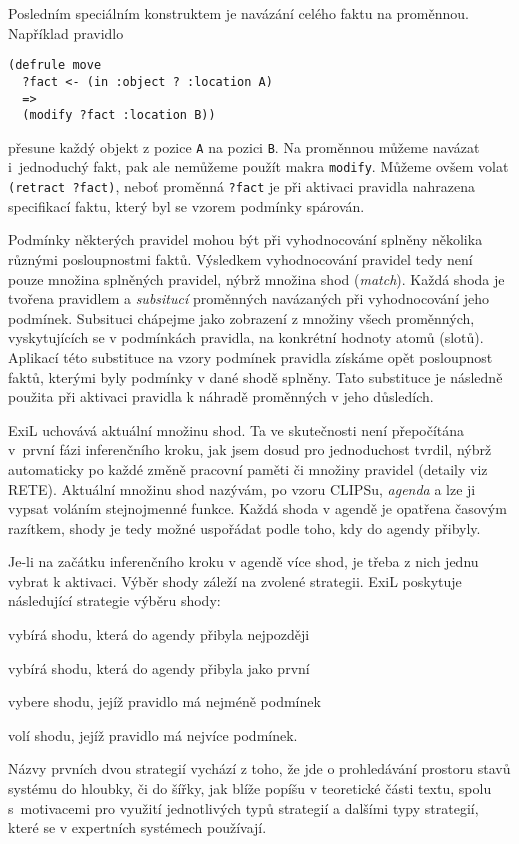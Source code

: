 Posledním speciálním konstruktem je navázání celého faktu na proměnnou.
Například pravidlo
\begin{verbatim}
(defrule move
  ?fact <- (in :object ? :location A)
  =>
  (modify ?fact :location B))
\end{verbatim}
přesune každý objekt z pozice \verb|A| na pozici \verb|B|. Na proměnnou
můžeme navázat i~jednoduchý fakt, pak ale nemůžeme použít makra \verb|modify|.
Můžeme ovšem volat \verb|(retract ?fact)|, neboť proměnná \verb|?fact| je při
aktivaci pravidla nahrazena specifikací faktu, který byl se vzorem podmínky
spárován.

Podmínky některých pravidel mohou být při vyhodnocování splněny několika různými
posloupnostmi faktů. Výsledkem vyhodnocování pravidel tedy není pouze množina
splněných pravidel, nýbrž množina shod (\emph{match}). Každá shoda je tvořena
pravidlem a \emph{subsitucí} proměnných navázaných při vyhodnocování jeho
podmínek.  Subsituci chápejme jako zobrazení z množiny všech proměnných,
vyskytujících se v podmínkách pravidla, na konkrétní hodnoty atomů (slotů).
Aplikací této substituce na vzory podmínek pravidla získáme opět posloupnost
faktů, kterými byly podmínky v dané shodě splněny. Tato substituce je následně
použita při aktivaci pravidla k náhradě proměnných v jeho důsledích.

ExiL uchovává aktuální množinu shod. Ta ve skutečnosti není přepočítána v~první
fázi inferenčního kroku, jak jsem dosud pro jednoduchost tvrdil, nýbrž
automaticky po každé změně pracovní paměti či množiny pravidel (detaily viz
RETE).  Aktuální množinu shod nazývám, po vzoru CLIPSu, \emph{agenda} a lze ji
vypsat voláním stejnojmenné funkce. Každá shoda v agendě je opatřena časovým
razítkem, shody je tedy možné uspořádat podle toho, kdy do agendy přibyly.

Je-li na začátku inferenčního kroku v agendě více shod, je třeba z nich jednu
vybrat k aktivaci. Výběr shody záleží na zvolené strategii. ExiL poskytuje
následující strategie výběru shody:
\begin{description}[leftmargin=5cm,style=sameline,align=right,labelsep=0.5cm]
  \item[depth-strategy] vybírá shodu, která do agendy přibyla nejpozději
  \item[breadth-strategy] vybírá shodu, která do agendy přibyla jako první
  \item[simplicity-strategy] vybere shodu, jejíž pravidlo má nejméně podmínek
  \item[complexity-strategy] volí shodu, jejíž pravidlo má nejvíce podmínek.
\end{description}
Názvy prvních dvou strategií vychází z toho, že jde o prohledávání prostoru
stavů systému do hloubky, či do šířky, jak blíže popíšu v teoretické části
textu, spolu s~motivacemi pro využití jednotlivých typů strategií a dalšími typy
strategií, které se v expertních systémech používají.

